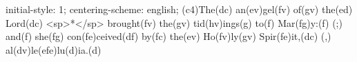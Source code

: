 initial-style: 1;
centering-scheme: english;
(c4)The(dc) an(ev)gel(fv) of(gv) the(ed) Lord(dc) <sp>*</sp> brought(fv) the(gv) tid(hv)ings(g) to(f) Mar(fg)y:(f) (;) and(f) she(fg) con(fe)ceived(df) by(fc) the(ev) Ho(fv)ly(gv) Spir(fe)it,(dc) (,) al(dv)le(efe)lu(d)ia.(d)
